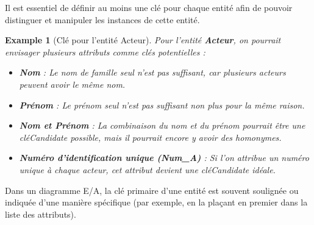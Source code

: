 \documentclass{article}
\newtheorem{example}{Example}
\begin{document}
Il est essentiel de définir au moins une clé pour chaque entité afin de pouvoir distinguer et manipuler les instances de cette entité.

\begin{example}[Clé pour l'entité Acteur]
    Pour l'entité \textbf{Acteur}, on pourrait envisager plusieurs attributs comme clés potentielles :

    \begin{itemize}
        \item \textbf{Nom} :  Le nom de famille seul n'est pas suffisant, car plusieurs acteurs peuvent avoir le même nom.
        \item \textbf{Prénom} :  Le prénom seul n'est pas suffisant non plus pour la même raison.
        \item \textbf{Nom et Prénom} :  La combinaison du nom et du prénom pourrait être une cléCandidate possible, mais il pourrait encore y avoir des homonymes.
        \item \textbf{Numéro d'identification unique (Num\_A)} :  Si l'on attribue un numéro unique à chaque acteur, cet attribut devient une cléCandidate idéale.
    \end{itemize}
\end{example}

Dans un diagramme E/A, la clé primaire d'une entité est souvent soulignée ou indiquée d'une manière spécifique (par exemple, en la plaçant en premier dans la liste des attributs).
\end{document}
